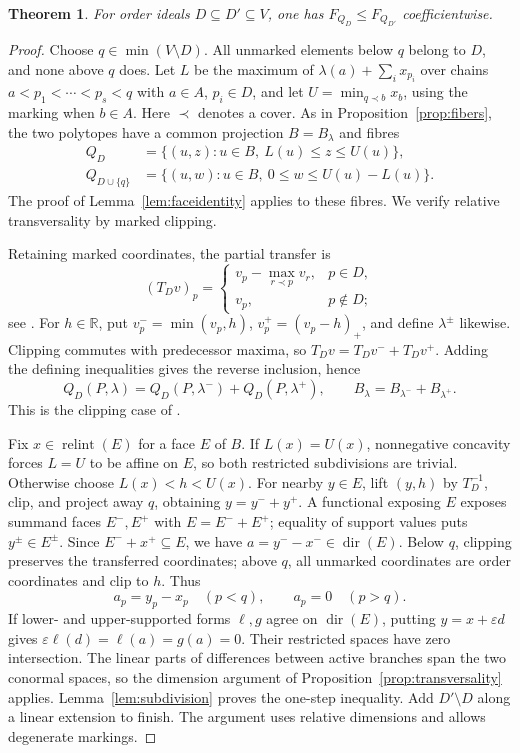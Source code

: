\documentclass[a4paper,12pt]{amsart}
\newtheorem{theorem}{Theorem}[section]
\theoremstyle{definition}
\theoremstyle{remark}
\newcommand{\relint}{\operatorname{relint}}
\newcommand{\dir}{\operatorname{dir}}
\begin{document}
\begin{theorem}\label{thm:marked-monotonicity}
For order ideals $D\subseteq D'\subseteq V$, one has $F_{Q_D}\leq F_{Q_{D'}}$ coefficientwise.
\end{theorem}
\begin{proof}
Choose $q\in\min(V\setminus D)$.
All unmarked elements below $q$ belong to $D$, and none above $q$ does.
Let $L$ be the maximum of $\lambda(a)+\sum_i x_{p_i}$ over chains $a<p_1<\cdots<p_s<q$ with $a\in A$, $p_i\in D$, and let $U=\min_{q\prec b}x_b$, using the marking when $b\in A$.
Here $\prec$ denotes a cover.
As in Proposition~\ref{prop:fibers}, the two polytopes have a common projection $B=B_\lambda$ and fibres
\begin{align*}
 Q_D&=\{(u,z):u\in B,\ L(u)\leq z\leq U(u)\},\\
 Q_{D\cup\{q\}}&=\{(u,w):u\in B,\ 0\leq w\leq U(u)-L(u)\}.
\end{align*}
The proof of Lemma~\ref{lem:faceidentity} applies to these fibres.
We verify relative transversality by marked clipping.

Retaining marked coordinates, the partial transfer is
\[
 (T_Dv)_p=
 \begin{cases}
 v_p-\max_{r\prec p}v_r,&p\in D,\\
 v_p,&p\notin D;
 \end{cases}
\]
see \cite[Theorem~2.1]{Fan+20}.
For $h\in\mathbb R$, put $v^-_p=\min(v_p,h)$, $v^+_p=(v_p-h)_+$, and define $\lambda^\pm$ likewise.
Clipping commutes with predecessor maxima, so $T_Dv=T_Dv^-+T_Dv^+$.
Adding the defining inequalities gives the reverse inclusion, hence
\[
 Q_D(P,\lambda)=Q_D(P,\lambda^-)+Q_D(P,\lambda^+),\qquad
 B_\lambda=B_{\lambda^-}+B_{\lambda^+}.
\]
This is the clipping case of \cite[Theorem~20]{FFP20}.

Fix $x\in\relint(E)$ for a face $E$ of $B$.
If $L(x)=U(x)$, nonnegative concavity forces $L=U$ to be affine on $E$, so both restricted subdivisions are trivial.
Otherwise choose $L(x)<h<U(x)$.
For nearby $y\in E$, lift $(y,h)$ by $T_D^{-1}$, clip, and project away $q$, obtaining $y=y^-+y^+$.
A functional exposing $E$ exposes summand faces $E^-,E^+$ with $E=E^-+E^+$; equality of support values puts $y^\pm\in E^\pm$.
Since $E^-+x^+\subseteq E$, we have $a=y^--x^-\in\dir(E)$.
Below $q$, clipping preserves the transferred coordinates; above $q$, all unmarked coordinates are order coordinates and clip to $h$.
Thus
\[
 a_p=y_p-x_p\quad(p<q),\qquad a_p=0\quad(p>q).
\]
If lower- and upper-supported forms $\ell,g$ agree on $\dir(E)$, putting $y=x+\varepsilon d$ gives $\varepsilon\ell(d)=\ell(a)=g(a)=0$.
Their restricted spaces have zero intersection.
The linear parts of differences between active branches span the two conormal spaces, so the dimension argument of Proposition~\ref{prop:transversality} applies.
Lemma~\ref{lem:subdivision} proves the one-step inequality.
Add $D'\setminus D$ along a linear extension to finish.
The argument uses relative dimensions and allows degenerate markings.
\end{proof}
\end{document}
